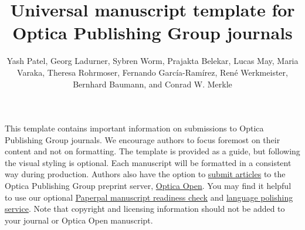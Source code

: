 \documentclass{optica-article}
\begin{document}
\title{Universal manuscript template for Optica Publishing Group journals}

\author{Yash Patel, Georg Ladurner, Sybren Worm, Prajakta Belekar, Lucas May, Maria Varaka, Theresa Rohrmoser, Fernando Garc\'{i}a-Ram\'{i}rez, Ren\'{e} Werkmeister, Bernhard Baumann, and Conrad W. Merkle}

\address{Center for Medical Physics and Biomedical Engineering, Medical University of Vienna, Währinger Gürtel 18-20/4L, 1090 Vienna, Austria\\
Institute of Biomedical Physics, Medical University of Innsbruck, Müllerstraße 44, 6020 Innsbruck, Austria}



\begin{abstract*} 
This template contains important information on submissions to Optica Publishing Group journals. We encourage authors to focus foremost on their content and not on formatting. The template is provided as a guide, but following the visual styling is optional. Each manuscript will be formatted in a consistent way during production. Authors also have the option to \href{https://opticaopen.org}{submit articles} to the Optica Publishing Group preprint server, \href{https://opticaopen.org/figshare}{Optica Open}. You may find it helpful to use our optional \href{https://preflight.paperpal.com/partner/optica/opticapublishinggroupjournals}{Paperpal manuscript readiness check}  and \href{https://languageediting.optica.org/}{language polishing service}. Note that copyright and licensing information should not be added to your journal or Optica Open manuscript. 

\end{abstract*}

\end{document}
